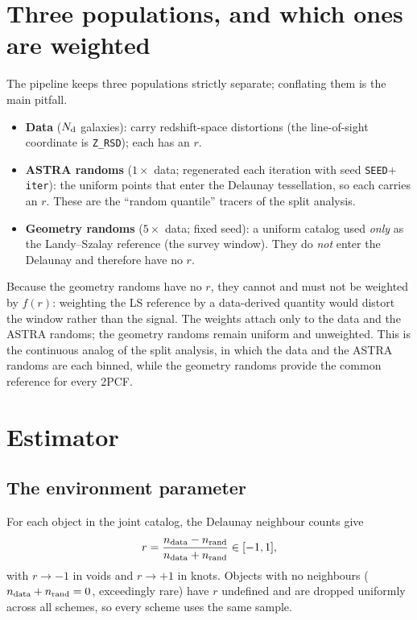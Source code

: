 \documentclass[11pt]{article}
\newcommand{\code}[1]{\texttt{#1}}
\newcommand{\rpar}{r}
\begin{document}
\section{Three populations, and which ones are weighted}
The pipeline keeps three populations strictly separate; conflating them is the
main pitfall.
\begin{itemize}
  \item \textbf{Data} ($N_{\rm d}$ galaxies): carry redshift-space distortions
        (the line-of-sight coordinate is \code{Z\_RSD}); each has an $\rpar$.
  \item \textbf{ASTRA randoms} ($1\times$ data; regenerated each iteration with
        seed \code{SEED}$+$\code{iter}): the uniform points that enter the
        Delaunay tessellation, so each carries an $\rpar$.  These are the
        ``random quantile'' tracers of the split analysis.
  \item \textbf{Geometry randoms} ($5\times$ data; fixed seed): a uniform catalog
        used \emph{only} as the Landy--Szalay reference (the survey window).  They
        do \emph{not} enter the Delaunay and therefore have no $\rpar$.
\end{itemize}
Because the geometry randoms have no $\rpar$, they cannot and must not be weighted
by $f(\rpar)$: weighting the LS reference by a data-derived quantity would distort
the window rather than the signal.  The weights attach only to the data and the
ASTRA randoms; the geometry randoms remain uniform and unweighted.  This is the
continuous analog of the split analysis, in which the data and the ASTRA randoms
are each binned, while the geometry randoms provide the common reference for every
2PCF.

\section{Estimator}
\subsection{The environment parameter}
For each object in the joint catalog, the Delaunay neighbour counts give
\begin{equation}
  \rpar=\frac{n_{\rm data}-n_{\rm rand}}{n_{\rm data}+n_{\rm rand}}\in[-1,1],
\end{equation}
with $\rpar\to-1$ in voids and $\rpar\to+1$ in knots.  Objects with no neighbours
($n_{\rm data}+n_{\rm rand}=0$, exceedingly rare) have $\rpar$ undefined and are
dropped uniformly across all schemes, so every scheme uses the same sample.
\end{document}
